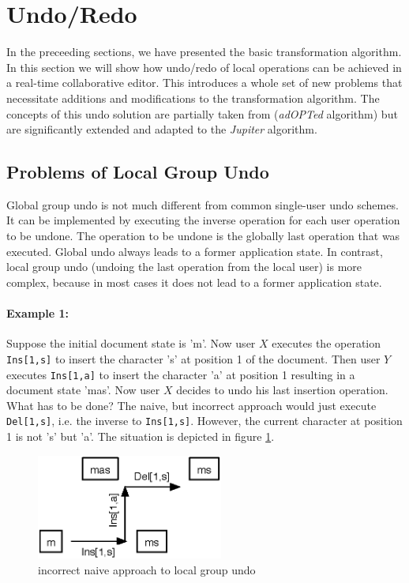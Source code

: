 \section{Undo/Redo}
In the preceeding sections, we have presented the basic transformation algorithm. In this section we will show how undo/redo of local operations can be achieved in a real-time collaborative editor. This introduces a whole set of new problems that necessitate additions and modifications to the transformation algorithm. The concepts of this undo solution are partially taken from \cite{ressel99} (\emph{adOPTed} algorithm) but are significantly extended and adapted to the \emph{Jupiter} algorithm.

\subsection{Problems of Local Group Undo}
Global group undo is not much different from common single-user undo schemes. It can be implemented by executing the inverse operation for each user operation to be undone. The operation to be undone is the globally last operation that was executed. Global undo always leads to a former application state. In contrast, local group undo (undoing the last operation from the local user) is more complex, because in most cases it does not lead to a former application state.

\paragraph{Example 1:} Suppose the initial document state is 'm'. Now user $X$ executes the operation \texttt{Ins[1,s]} to insert the character 's' at position 1 of the document. Then user $Y$ executes \texttt{Ins[1,a]} to insert the character 'a' at position 1 resulting in a document state 'mas'. Now user $X$ decides to undo his last insertion operation. What has to be done? The naive, but incorrect approach would just execute \texttt{Del[1,s]}, i.e. the inverse to \texttt{Ins[1,s]}. However, the current character at position 1 is not 's' but 'a'. The situation is depicted in figure \ref{fig:concepts.naiveundo}.

\begin{figure}[htb]
 \centering
 \includegraphics[width=6.13cm,height=3.45cm]{../../images/concepts_naiveundo.eps}
 \caption{incorrect naive approach to local group undo}
 \label{fig:concepts.naiveundo}
\end{figure}

